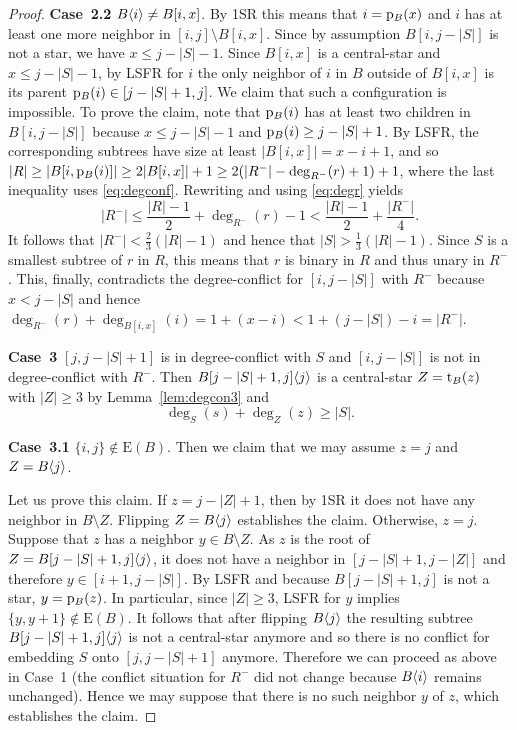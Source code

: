 \documentclass[11pt,a4paper,colorlinks=true,urlcolor=blue,citecolor=red]{article}
\theoremstyle{plain}
\newcommand{\case}[1]{\par\vspace{.5\baselineskip}\noindent\textbf{\sffamily Case~#1}}
\newcommand{\EB}{\mathrm{E}(B)}
\begin{document}
\begin{proof}
  \case{2.2} $B\langle{i}\rangle\ne B[i,x]$. By 1SR this means that $i=\mathrm p_B(x)$
  and $i$ has at least one more neighbor in $[i,j]\setminus
  B[i,x]$. Since by assumption $B[i,j-|S|]$ is not a star, we have $x\le
  j-|S|-1$. Since $B[i,x]$ is a central-star and $x\le j-|S|-1$, by LSFR
  for $i$ the only neighbor of $i$ in $B$ outside of $B[i,x]$ is its
  parent $\mathrm p_B(i)\in[j-|S|+1,j]$.
We claim that such a configuration is impossible. To prove the claim,
  note that $\mathrm p_B(i)$ has at least two children in $B[i,j-|S|]$ because
  $x\le j-|S|-1$ and $\mathrm p_B(i)\ge j-|S|+1$. By LSFR, the corresponding
  subtrees have size at least $|B[i,x]|=x-i+1$, and so
$|R|\geq |B[i,\mathrm p_B(i)]|\ge 2|B[i,x]|+1\ge
  2(|R^-|-\deg_{R^-}(r)+1)+1$,
where the last inequality uses \eqref{eq:degconf}. Rewriting and using
  \eqref{eq:degr} yields
\[|R^-|\leq
  \frac{|R|-1}{2}+\deg_{R^-}(r)-1<\frac{|R|-1}{2}+\frac{|R^-|}{4}.\]
It follows that $|R^-|<\frac23(|R|-1)$ and hence that
  $|S|>\frac13(|R|-1)$. Since $S$ is a smallest subtree of $r$ in $R$,
  this means that $r$ is binary in $R$ and thus unary in $R^-$. This,
  finally, contradicts the degree-conflict for $[i,j-|S|]$ with $R^-$
  because $x<j-|S|$ and hence $\deg_{R^-}(r)+\deg_{B[i,x]}(i)=1+(x-i)<
  1+(j-|S|)-i=|R^-|$.

  \case{3} $[j,j-|S|+1]$ is in degree-conflict with $S$ and $[i,j-|S|]$
  is not in degree-conflict with $R^-$. Then $B{[j-|S|+1,j]}\langle{j}\rangle$
  is a central-star $Z=\mathrm t_B(z)$ with $|Z|\ge 3$ by
  Lemma~\ref{lem:degcon3} and
\begin{equation}\label{eq:degcz}
    \deg_S(s)+\deg_Z(z)\ge|S|.
  \end{equation}


  \case{3.1} $\{i,j\}\notin\EB$. Then we claim that we may
  assume $z=j$ and $Z=B\langle{j}\rangle$.

  Let us prove this claim. If $z=j-|Z|+1$, then by 1SR it does not have
  any neighbor in $B\setminus Z$. Flipping $Z=B\langle{j}\rangle$ establishes
  the claim. Otherwise, $z=j$. Suppose that $z$ has a neighbor
  $y\in B\setminus Z$. As $z$ is the root of
  $Z=B{[j-|S|+1,j]}\langle{j}\rangle$, it does not have a neighbor in
  $[j-|S|+1,j-|Z|]$ and therefore $y\in[i+1,j-|S|]$. By LSFR and because
  $B[j-|S|+1,j]$ is not a star, $y=\mathrm p_B(z)$. In particular, since
  $|Z|\ge 3$, LSFR for $y$ implies $\{y,y+1\}\notin\EB$. It follows that
  after flipping $B\langle{j}\rangle$ the resulting subtree
  $B{[j-|S|+1,j]}\langle{j}\rangle$ is not a central-star anymore and so there
  is no conflict for embedding $S$ onto $[j,j-|S|+1]$ anymore. Therefore
  we can proceed as above in Case~1 (the conflict situation for $R^-$
  did not change because $B\langle{i}\rangle$ remains unchanged). Hence we may
  suppose that there is no such neighbor $y$ of $z$, which establishes
  the claim.


\end{proof}
\end{document}
